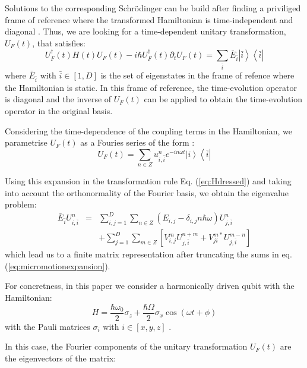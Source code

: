 \documentclass[pra,twocolumn,showkeys,preprintnumbers, amsmath,amssymb, aps,A4paper]{revtex4-1}
\begin{document}
Solutions to the corresponding Schr\"odinger can be build after finding a priviliged frame of reference where the transformed Hamiltonian is time-independent and diagonal \cite{}. Thus, we are looking for a time-dependent unitary transformation, $U_F(t)$, that satisfies:
\begin{equation}
 U_F^\dagger(t) H(t)  U_F(t) - i \hbar  U_F^\dagger(t) \partial_t  U_F(t) =  \sum_{\bar{i}} \bar{E}_{\bar{i}} \left| \bar{i} \right\rangle \left\langle \bar{i} \right|
\label{eq:Hdressed}
\end{equation}
where $\bar{E}_{\bar{i}}$ with $\bar{i} \in [1,D]$ is the set of eigenstates in the frame of refence where the Hamiltonian is static. In this frame of reference, the time-evolution operator is diagonal and the inverse of $U_F(t)$ can be applied to obtain the time-evolution operator in the original basis. 

Considering the time-dependence of the coupling terms in the Hamiltonian, we parametrise $U_F(t)$ as a Fouries series of the form \cite{ho1983semiclassical}:
\begin{equation}
U_F(t) = \sum_{n\in Z} u_{i,\bar{i}}^{n} e^{-in\omega t} \left| i \right\rangle \left\langle \bar{i} \right|
\label{eq:micromotionexpansion}
\end{equation}

Using this expansion in the transformation rule Eq. (\ref{eq:Hdressed}) and taking into account the orthonormality of the Fourier basis, we obtain the eigenvalue problem:
\begin{eqnarray}
\bar{E}_{\bar{i}}U^{n}_{i,\bar{i}}&=&\sum_{i,j=1}^{D} \sum_{n\in Z}(E_{i,j} - \delta_{i,j} n \hbar \omega)U^{n}_{j,\bar{i}} \nonumber \\
&&+ \sum_{j=1}^D \sum_{m\in Z} \left[ V^{m}_{i,j} U^{n+m}_{j,\bar{i}} + V^{m*}_{ji} U^{m-n}_{j,\bar{i}}\right]
\label{eq:floqueteigenproblem}
\end{eqnarray}
which lead us to a finite matrix representation after truncating the sums in eq. (\ref{eq:micromotionexpansion}). 

For concretness, in this paper we consider a harmonically driven qubit with the Hamiltonian:
\begin{equation}
H = \frac{\hbar \omega_0}{2} \sigma_z + \frac{\hbar \Omega}{2} \sigma_x \cos (\omega t + \phi)
\end{equation}
with the Pauli matrices $\sigma_i$ with $i\in[x,y,z]$ \cite{}.

In this case, the Fourier components of the unitary transformation $U_F(t)$ are the eigenvectors of the matrix:
\end{document}
